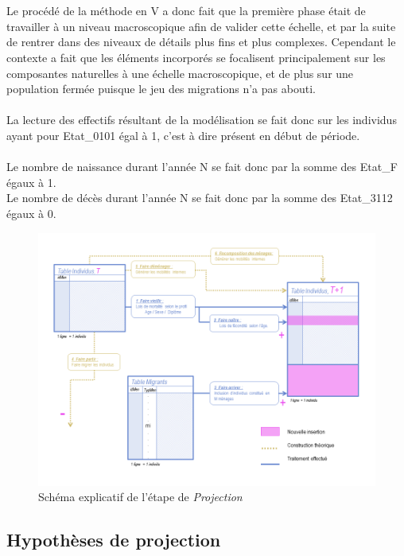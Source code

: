 \documentclass{bredele}
\begin{document}
\\\\Le procédé de la méthode en V a donc fait que la première phase était de travailler à un niveau macroscopique afin de valider cette échelle, et par la suite de rentrer dans des niveaux de détails plus fins et plus complexes. Cependant le contexte a fait que les éléments incorporés se focalisent principalement sur les composantes naturelles à une échelle macroscopique, et de plus sur une population fermée puisque le jeu des migrations n'a pas abouti.
\\\\La lecture des effectifs résultant de la modélisation se fait donc sur les individus ayant pour Etat\_0101 égal à 1, c'est à dire présent en début de période.
\\\\Le nombre de naissance durant l'année N se fait donc par la somme des Etat\_F égaux à 1.
\\Le nombre de décès durant l'année N se fait donc par la somme des Etat\_3112 égaux à 0.

\begin{figure}[!htb]\centering
\clearpage
\includegraphics[width=\textwidth]{PROCESSBDD_5}
\caption{Schéma explicatif de l'étape de \textit{Projection}}
\end{figure}

\newpage
\subsection{Hypothèses de projection}
\end{document}
